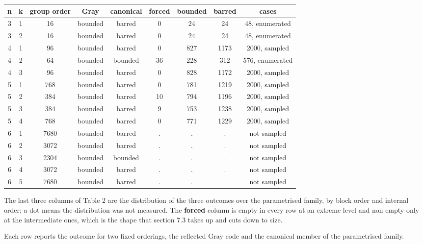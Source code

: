 \documentclass[11pt,a4paper]{article}
\begin{document}
\begingroup\footnotesize\setlength{\tabcolsep}{4pt}
\begin{longtable}[c]{ccccccccc}
\textbf{n} & \textbf{k} & \textbf{group order} & \textbf{Gray} & \textbf{canonical} & \textbf{forced} & \textbf{bounded} & \textbf{barred} & \textbf{cases} \\
\hline
3 & 1 & 16 & bounded & barred & 0 & 24 & 24 & 48, enumerated \\
3 & 2 & 16 & bounded & barred & 0 & 24 & 24 & 48, enumerated \\
4 & 1 & 96 & bounded & barred & 0 & 827 & 1173 & 2000, sampled \\
4 & 2 & 64 & bounded & bounded & 36 & 228 & 312 & 576, enumerated \\
4 & 3 & 96 & bounded & barred & 0 & 828 & 1172 & 2000, sampled \\
5 & 1 & 768 & bounded & barred & 0 & 781 & 1219 & 2000, sampled \\
5 & 2 & 384 & bounded & barred & 10 & 794 & 1196 & 2000, sampled \\
5 & 3 & 384 & bounded & barred & 9 & 753 & 1238 & 2000, sampled \\
5 & 4 & 768 & bounded & barred & 0 & 771 & 1229 & 2000, sampled \\
6 & 1 & 7680 & bounded & barred & . & . & . & not sampled \\
6 & 2 & 3072 & bounded & barred & . & . & . & not sampled \\
6 & 3 & 2304 & bounded & bounded & . & . & . & not sampled \\
6 & 4 & 3072 & bounded & barred & . & . & . & not sampled \\
6 & 5 & 7680 & bounded & barred & . & . & . & not sampled \\
\end{longtable}
\endgroup

The last three columns of Table 2 are the distribution of the three outcomes over the parametrised family, by block order and internal order; a dot means the distribution was not measured. The \textbf{forced} column is empty in every row at an extreme level and non empty only at the intermediate ones, which is the shape that section 7.3 takes up and cuts down to size.

Each row reports the outcome for two fixed orderings, the reflected Gray code and the canonical member of the parametrised family.
\end{document}
